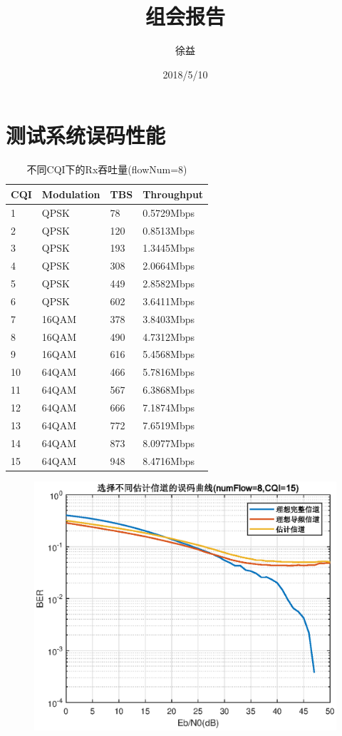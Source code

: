 \documentclass{article}
\title{组会报告}
\author{徐益}
\date{2018/5/10}
\begin{document}
	
\maketitle



\section{测试系统误码性能}
\begin{table}[H]
	\caption{不同CQI下的Rx吞吐量(flowNum=8)}
	\centering
	\begin{tabular}{|l|l|l|l|}%
		\hline  %
		CQI &	Modulation	&	TBS	&	Throughput	\\
		\hline
		1	&	QPSK		&	78	&	0.5729Mbps	\\
		\hline
		2	&	QPSK		&	120	&	0.8513Mbps	\\
		\hline
		3	&	QPSK		&	193	&	1.3445Mbps	\\
		\hline
		4	&	QPSK		&	308	&	2.0664Mbps	\\
		\hline
		5	&	QPSK		&	449	&	2.8582Mbps	\\
		\hline
		6	&	QPSK		&	602	&	3.6411Mbps	\\
		\hline
		7	&	16QAM		&	378	&	3.8403Mbps	\\
		\hline
		8	&	16QAM		&	490	&	4.7312Mbps	\\
		\hline
		9	&	16QAM		&	616	&	5.4568Mbps	\\
		\hline
		10	&	64QAM		&	466	&	5.7816Mbps	\\
		\hline
		11	&	64QAM		&	567	&	6.3868Mbps	\\
		\hline
		12	&	64QAM		&	666	&	7.1874Mbps	\\
		\hline
		13	&	64QAM		&	772	&	7.6519Mbps	\\
		\hline
		14	&	64QAM		&	873	&	8.0977Mbps	\\
		\hline
		15	&	64QAM		&	948	&	8.4716Mbps	\\
		\hline  %
	\end{tabular}
	\end{table}
\begin{figure}[H]
	\centering
	\includegraphics[width = .6\textwidth]{plot/plot_CQI15.eps}
\end{figure}
\end{document}
